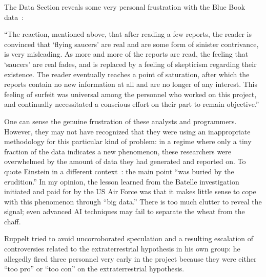 The Data Section reveals some very personal frustration with the Blue Book data~\cite[p.~93]{ATIC1955May-SR14}:
\begin{svgraybox}
``The reaction, mentioned above, that after reading a few reports, the
reader is convinced that `flying saucers' are real and are some form of
sinister contrivance, is very misleading. As more and more of the reports
are read, the feeling that `saucers' are real fades, and is replaced by a
feeling of skepticism regarding their existence. The reader eventually
reaches a point of saturation, after which the reports contain no new information
at all and are no longer of any interest. This feeling of surfeit was
universal among the personnel who worked on this project, and continually
necessitated a conscious effort on their part to remain objective.''
\end{svgraybox}

One can sense the genuine frustration of these analysts and programmers. However, they may not have recognized
that they were using an inappropriate methodology for this particular kind of problem:
in a regime where only a tiny fraction of the data indicates a new phenomenon,
these researchers were overwhelmed by the amount of data they had generated and reported on.
To quote Einstein in a different context~\cite{einstei-letter-to-schr,Meyenn-2011,Howard1985171,Howard1990}: the main point ``was buried by the erudition.''
In my opinion, the lesson learned from the Batelle investigation initiated and paid for by the US Air Force was that it makes little sense to cope with this phenomenon through ``big data.'' There is too much clutter to reveal the signal; even advanced AI techniques may fail to separate the wheat from the chaff.

Ruppelt tried to avoid uncorroborated speculation and a resulting escalation of controversies related to the extraterrestrial hypothesis in his own group: he allegedly fired three personnel very early in the project because they were either ``too pro'' or ``too con'' on the extraterrestrial hypothesis.

